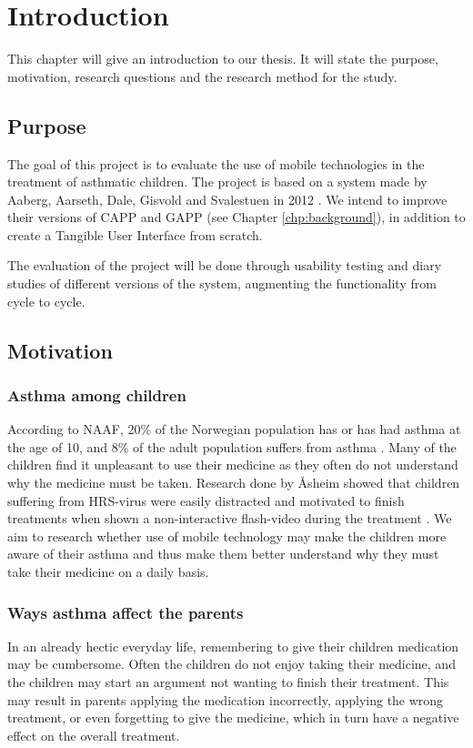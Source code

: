 \chapter{Introduction}
\label{chp:introduction}

This chapter will give an introduction to our thesis. It will state the purpose, motivation, research questions and the research method for the study. 

\section{Purpose}
\label{sec:purpose}
The goal of this project is to evaluate the use of mobile technologies in the treatment of asthmatic children. The project is based on a system made by Aaberg, Aarseth, Dale, Gisvold and Svalestuen in 2012 \cite{CustomerDriven}. We intend to improve their versions of CAPP and GAPP (see Chapter \ref{chp:background}), in addition to create a Tangible User Interface from scratch. 

The evaluation of the project will be done through usability testing and diary studies of different versions of the system, augmenting the functionality from cycle to cycle. 



\section{Motivation}
\label{sec:motivation}

\subsection{Asthma among children}
According to NAAF, 20\% of the Norwegian population has or has had asthma at the age of 10, and 8\% of the adult population suffers from asthma \cite{NAAF}. Many of the children find it unpleasant to use their medicine as they often do not understand why the medicine must be taken. Research done by \r{A}sheim showed that children suffering from HRS-virus were easily distracted and motivated to finish treatments when shown a non-interactive flash-video during the treatment \cite{Asheim610877}. We aim to research whether use of mobile technology may make the children more aware of their asthma and thus make them better understand why they must take their medicine on a daily basis. 


\subsection{Ways asthma affect the parents}
In an already hectic everyday life, remembering to give their children medication may be cumbersome. Often the children do not enjoy taking their medicine, and the children may start an argument not wanting to finish their treatment. This may result in parents applying the medication incorrectly, applying the wrong treatment, or even forgetting to give the medicine, which in turn have a negative effect on the overall treatment.  



